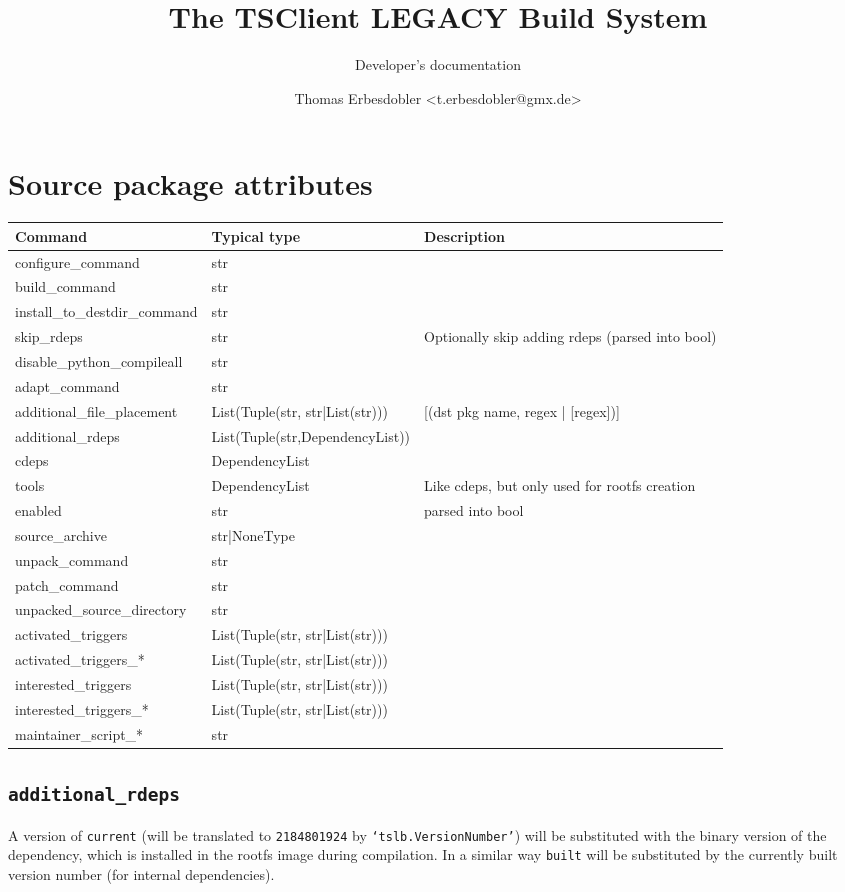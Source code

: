 \documentclass[a4paper]{scrartcl}
\title{The TSClient LEGACY Build System}
\subtitle{Developer's documentation}
\author{Thomas Erbesdobler <t.erbesdobler@gmx.de>}
\newcommand{\python}[1]{\texttt{`#1'}}
\begin{document}
	\maketitle
	\tableofcontents
	
	\pagebreak
	
	\section{Source package attributes}
	\label{sec:source_package_attributes}
	
	\begin{tabularx}{\textwidth}{llX}
		Command & Typical type & Description \\
		\hline
		configure\_command & str & \\
		build\_command & str & \\
		install\_to\_destdir\_command & str & \\
		skip\_rdeps & str & Optionally skip adding rdeps (parsed into bool) \\
		disable\_python\_compileall & str & \\
		adapt\_command & str & \\
		additional\_file\_placement & List(Tuple(str, str|List(str))) & [(dst pkg name, regex | [regex])]\\
		additional\_rdeps & List(Tuple(str,DependencyList)) & \\
		cdeps & DependencyList & \\
		tools & DependencyList&  Like cdeps, but only used for rootfs creation \\
		enabled & str & parsed into bool \\
		source\_archive & str|NoneType & \\
		unpack\_command & str & \\
		patch\_command & str & \\
		unpacked\_source\_directory & str & \\
		activated\_triggers & List(Tuple(str, str|List(str))) & \\
		activated\_triggers\_* & List(Tuple(str, str|List(str))) & \\
		interested\_triggers & List(Tuple(str, str|List(str))) & \\
		interested\_triggers\_* & List(Tuple(str, str|List(str))) & \\
		maintainer\_script\_* & str & \\
	\end{tabularx}

	\subsection{\texttt{additional\_rdeps}}
	\label{sec:additional_rdeps}
	
	A version of \texttt{current} (will be translated to \texttt{2184801924} by \python{tslb.VersionNumber}) will be substituted with the binary version of the dependency, which is installed in the rootfs image during compilation. In a similar way \texttt{built} will be substituted by the currently built version number (for internal dependencies).
	
\end{document}
